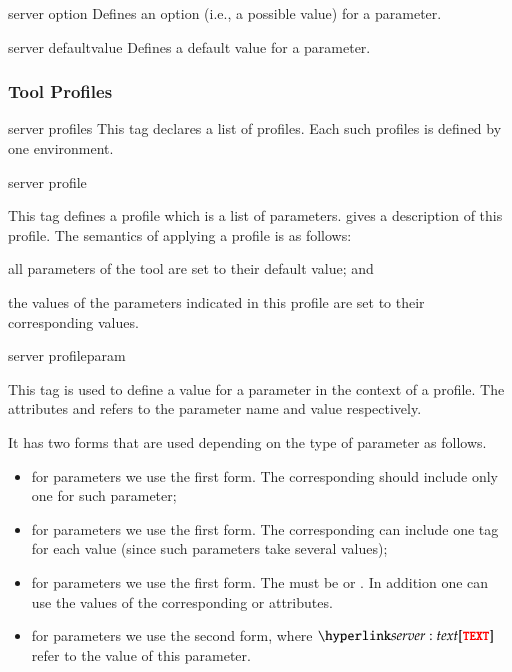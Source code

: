 \bigskip
\xmlstruct
{server}
{option}
{%
Defines an option (i.e., a possible value) for a parameter.
}


\bigskip
\xmlstruct
{server}
{defaultvalue}
{%
Defines a default value for a parameter.
}

\subsubsection{Tool Profiles}

\bigskip
\xmlstruct
{server}
{profiles}
{%
%
  This tag declares a list of profiles. Each such profiles is defined
  by one  environment.
%
}

\bigskip
\xmlstruct
{server}
{profile}
{%
%
  This tag defines a profile which is a list of
  parameters.  gives a description
  of this profile. The semantics of applying a profile is as follows:
%
\begin{inparaenum}
\item all parameters of the tool are set to their default value; and
\item the values of the parameters indicated in this profile are set
  to their corresponding values.
\end{inparaenum}
%
}


\bigskip
\xmlstruct
{server}
{profileparam}
{%
%
  This tag is used to define a value for a parameter in the context of
  a profile. The attributes  and  refers
  to the parameter name and value respectively.

  It has two forms that are used depending on the type of parameter as
  follows.
%
  \begin{itemize}
%
  \item for  parameters we use the
    first form. The corresponding 
    should include only one  for such parameter;
%
  \item for  parameters we use the
    first form. The corresponding  can
    include one  tag for each value (since such
    parameters take several values);
%
  \item for  parameters we use the first
    form. The  must be  or
    . In addition one can use the values of the
    corresponding  or 
    attributes.
%
  \item for  parameters we use the
    second form, where $\xmlstructref{server}{text}$ refer to the
    value of this parameter.
    \end{itemize}
}

